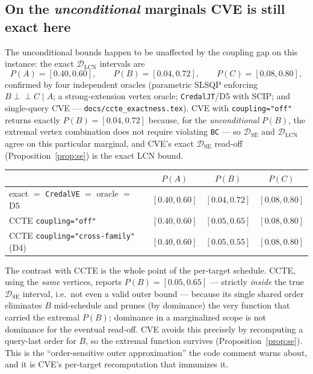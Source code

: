 \documentclass[11pt]{article}
\newcommand{\indep}{\perp\!\!\!\perp}
\newcommand{\DSE}{\mathcal{D}_{\mathrm{SE}}}
\newcommand{\DLCN}{\mathcal{D}_{\mathrm{LCN}}}
\newcommand{\CVE}{\texttt{CredalVE}}
\begin{document}
\subsection{On the \emph{unconditional} marginals CVE is still exact here}
The unconditional bounds happen to be unaffected by the coupling gap on this instance: the exact
$\DLCN$ intervals are
\[
  P(A)=[0.40,0.60],\qquad P(B)=[0.04,0.72],\qquad P(C)=[0.08,0.80],
\]
confirmed by four independent oracles (parametric SLSQP enforcing $B\indep C\mid A$; a
strong-extension vertex oracle; \texttt{CredalJT}/D5 with SCIP; and single-query CVE ---
\texttt{docs/ccte\_exactness.tex}). CVE with \texttt{coupling="off"} returns exactly $P(B)=[0.04,0.72]$
because, for the \emph{unconditional} $P(B)$, the extremal vertex combination does not require
violating \texttt{BC} --- so $\DSE$ and $\DLCN$ agree on this particular marginal, and CVE's exact
$\DSE$ read-off (Proposition~\ref{prop:se}) is the exact LCN bound.

\begin{center}\small
\begin{tabular}{lccc}
\toprule
 & $P(A)$ & $P(B)$ & $P(C)$ \\
\midrule
exact $=$ \CVE{} $=$ oracle $=$ D5 & $[0.40,0.60]$ & $\mathbf{[0.04,0.72]}$ & $[0.08,0.80]$ \\
CCTE \texttt{coupling="off"}          & $[0.40,0.60]$ & $\mathbf{[0.05,0.65]}$ & $[0.08,0.80]$ \\
CCTE \texttt{coupling="cross-family"} (D4) & $[0.40,0.60]$ & $\mathbf{[0.05,0.55]}$ & $[0.08,0.80]$ \\
\bottomrule
\end{tabular}
\end{center}
The contrast with CCTE is the whole point of the per-target schedule. CCTE, using the \emph{same}
vertices, reports $P(B)=[0.05,0.65]$ --- strictly \emph{inside} the true $\DSE$ interval, i.e.\ not
even a valid outer bound --- because its single shared order eliminates $B$ mid-schedule and prunes
(by dominance) the very function that carried the extremal $P(B)$; dominance in a marginalized scope
is not dominance for the eventual read-off. CVE avoids this precisely by recomputing a query-last
order for $B$, so the extremal function survives (Proposition~\ref{prop:se}). This is the
``order-sensitive outer approximation'' the code comment warns about, and it is CVE's per-target
recomputation that immunizes it.
\end{document}
